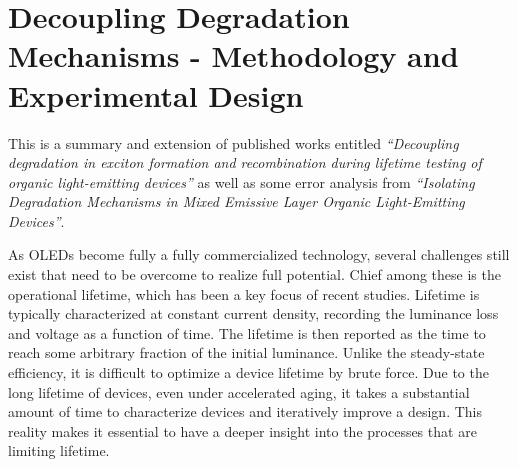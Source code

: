 \documentclass[../thesis.tex]{subfiles}
\begin{document}
\chapter{Decoupling Degradation Mechanisms - Methodology and Experimental Design} \label{sec:integrated_lifetime}
This is a summary and extension of published works entitled \textit{``Decoupling degradation in exciton formation and recombination during lifetime testing of organic light-emitting devices''}\supercite{Hershey2017} as well as some error analysis from \textit{``Isolating Degradation Mechanisms in Mixed Emissive Layer Organic Light-Emitting Devices''}\supercite{Bangsund2018}.

As OLEDs become fully a fully commercialized technology, several challenges still exist that need to be overcome to realize full potential.
Chief among these is the operational lifetime, which has been a key focus of recent studies.\supercite{Scholz2015,DeMoraes2011,Seifert2013b,Moraes2011,Burrows1994,Seifert2013b}
Lifetime is typically characterized at constant current density, recording the luminance loss and voltage as a function of time.
The lifetime is then reported as the time to reach some arbitrary fraction of the initial luminance.
Unlike the steady-state efficiency, it is difficult to optimize a device lifetime by brute force.  
Due to the long lifetime of devices, even under accelerated aging, it takes a substantial amount of time to characterize devices and iteratively improve a design.
This reality makes it essential to have a deeper insight into the processes that are limiting lifetime.
\end{document}
